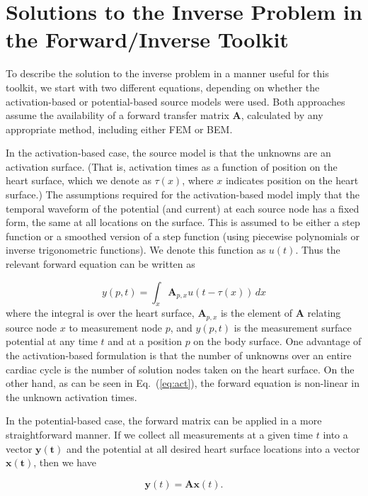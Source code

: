 \section{Solutions to the Inverse Problem in the Forward/Inverse Toolkit}

To describe the solution to the inverse problem in a manner useful for this
toolkit, we start with two different equations, depending on whether the
activation-based or potential-based source models were used. Both
approaches assume the availability of a forward transfer matrix
$\mathbf{A}$, calculated by any appropriate method, including either FEM or
BEM.

In the activation-based case, the source model is that the unknowns are an
activation surface. (That is, activation times as a function of position on
the heart surface, which we denote as $\tau(x)$, where $x$ indicates
position on the heart surface.)
The assumptions required for the activation-based model imply that the temporal waveform of the potential
(and current) at each source node has a fixed form, the same at all
locations on the surface.
This is assumed to be either a step function or a smoothed version of a step function (using
piecewise polynomials or inverse trigonometric functions). We denote this
function as $u(t)$. Thus the relevant forward equation can be written as

\begin{equation} y(p,t) = \int_{x} \mathbf{A}_{p,x}u(t-\tau(x))\,dx \label{eq:act}
\end{equation}
%
\noindent where the integral is over the heart surface, $\mathbf{A}_{p,x}$ is the
element of $\mathbf{A}$ relating source node $x$ to measurement node $p$,
and $y(p,t)$ is the measurement surface potential at any time $t$ and at a
position $p$ on the body surface. One advantage of the activation-based
formulation is that the number of unknowns over an entire cardiac cycle is
the number of solution nodes taken on the heart surface. On the other hand,
as can be seen in Eq.~(\ref{eq:act}), the forward equation is non-linear in
the unknown activation times.

In the potential-based case, the forward matrix can be applied in a more
straightforward manner. If we collect all measurements at a given time $t$ into
a vector $\mathbf{y(t)}$ and the potential at all desired heart surface locations
into a vector $\mathbf{x(t)}$, then we have

\begin{equation} \mathbf{y}(t) = \mathbf{A}\mathbf{x}(t).\label{eq:TransMat}
\end{equation}

